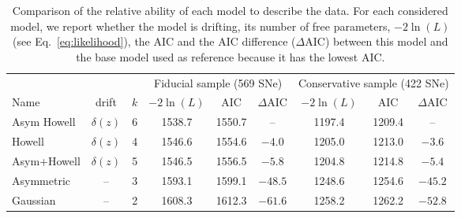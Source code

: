 \documentclass[../main/main.tex]{subfiles}
\begin{document}
\begin{table*}
    \centering
    \caption{Comparison of the relative ability of each model to describe the
        data. For each considered model, we report whether the model is
        drifting, its number of free parameters, $-2\ln(L)$ (see
        Eq.~\ref{eq:likelihood}), the AIC and the AIC difference ($\Delta$AIC)
        between this model and the base model used as reference because it has
    the lowest AIC.}
    \label{tab:modelcomp}
    \begin{tabular}{lcccccccc}
        \toprule
        & & & \multicolumn{3}{c}{Fiducial sample (569 SNe)}
            & \multicolumn{3}{c}{Conservative sample (422 SNe)} \\
        \cmidrule(lr){4-6}\cmidrule(lr){7-9}
        Name & drift & $k$ &
        $-2\ln(L)$ & AIC & $\Delta$AIC & $-2\ln(L)$ & AIC & $\Delta$AIC\\[0.2em]
        \midrule

        Asym Howell & $\delta(z)$ & 6
        & 1538.7 & 1550.7 & -- 
        & 1197.4 & 1209.4 & -- \\

        Howell & $\delta(z)$ & 4
        & 1546.6 & 1554.6 & $-4.0$
        & 1205.0 & 1213.0 & $-3.6$ 
        \\

        Asym+Howell & $\delta(z)$ & 5
        & 1546.5 & 1556.5 & $-5.8$
        & 1204.8 & 1214.8 & $-5.4$ 
        \\

        Asymmetric & -- & 3
        & 1593.1 & 1599.1 & $-48.5$
        & 1248.6 & 1254.6 & $-45.2$ 
        \\

        Gaussian & -- & 2
        & 1608.3 & 1612.3 & $-61.6$
        & 1258.2 & 1262.2 & $-52.8$ 
        \\
        \bottomrule
    \end{tabular}
\end{table*}
\end{document}
